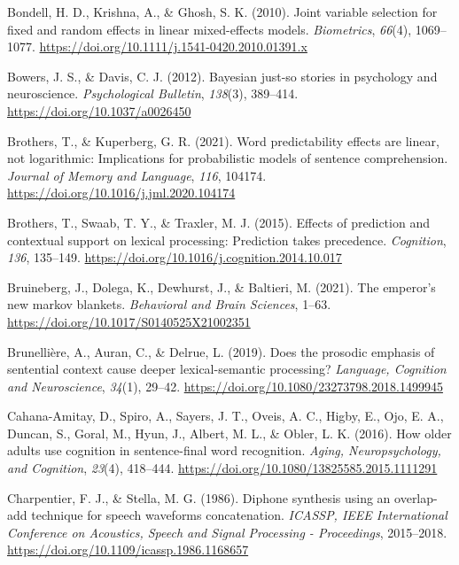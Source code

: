 \documentclass[a4paper, nobind]{templates/ociamthesis}
\newlength{\cslhangindent}
\newenvironment{CSLReferences}[2] %
 {%
  \setlength{\parindent}{0pt}
  \ifodd #1
  \let\oldpar\par
  \def\par{\hangindent=\cslhangindent\oldpar}
  \fi
  \setlength{\parskip}{1mm}
  \setlength{\baselineskip}{6mm}
 }%
 {}
\begin{document}
\begin{CSLReferences}{1}{0}
\leavevmode{}%
Bondell, H. D., Krishna, A., \& Ghosh, S. K. (2010). Joint variable selection for fixed and random effects in linear mixed-effects models. \emph{Biometrics}, \emph{66}(4), 1069--1077. \url{https://doi.org/10.1111/j.1541-0420.2010.01391.x}

\leavevmode{}%
Bowers, J. S., \& Davis, C. J. (2012). {Bayesian just-so stories in psychology and neuroscience}. \emph{Psychological Bulletin}, \emph{138}(3), 389--414. \url{https://doi.org/10.1037/a0026450}

\leavevmode{}%
Brothers, T., \& Kuperberg, G. R. (2021). {Word predictability effects are linear, not logarithmic: Implications for probabilistic models of sentence comprehension}. \emph{Journal of Memory and Language}, \emph{116}, 104174. \url{https://doi.org/10.1016/j.jml.2020.104174}

\leavevmode{}%
Brothers, T., Swaab, T. Y., \& Traxler, M. J. (2015). {Effects of prediction and contextual support on lexical processing: Prediction takes precedence}. \emph{Cognition}, \emph{136}, 135--149. \url{https://doi.org/10.1016/j.cognition.2014.10.017}

\leavevmode{}%
Bruineberg, J., Dolega, K., Dewhurst, J., \& Baltieri, M. (2021). The emperor's new markov blankets. \emph{Behavioral and Brain Sciences}, 1--63. \url{https://doi.org/10.1017/S0140525X21002351}

\leavevmode{}%
Brunellière, A., Auran, C., \& Delrue, L. (2019). {Does the prosodic emphasis of sentential context cause deeper lexical-semantic processing?} \emph{Language, Cognition and Neuroscience}, \emph{34}(1), 29--42. \url{https://doi.org/10.1080/23273798.2018.1499945}

\leavevmode{}%
Cahana-Amitay, D., Spiro, A., Sayers, J. T., Oveis, A. C., Higby, E., Ojo, E. A., Duncan, S., Goral, M., Hyun, J., Albert, M. L., \& Obler, L. K. (2016). {How older adults use cognition in sentence-final word recognition}. \emph{Aging, Neuropsychology, and Cognition}, \emph{23}(4), 418--444. \url{https://doi.org/10.1080/13825585.2015.1111291}

\leavevmode{}%
Charpentier, F. J., \& Stella, M. G. (1986). {Diphone synthesis using an overlap-add technique for speech waveforms concatenation.} \emph{ICASSP, IEEE International Conference on Acoustics, Speech and Signal Processing - Proceedings}, 2015--2018. \url{https://doi.org/10.1109/icassp.1986.1168657}


\end{CSLReferences}
\end{document}
